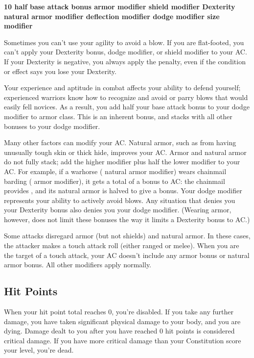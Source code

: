 {\centering \textbf{10 \add half base attack bonus \add armor modifier \add shield modifier \add Dexterity \add natural armor modifier \add deflection modifier \add dodge modifier \add size modifier}}

Sometimes you can't use your agility to avoid a blow. If you are flat-footed, you can't apply your Dexterity bonus, dodge modifier, or shield modifier to your AC. If your Dexterity is negative, you always apply the penalty, even if the condition or effect says you lose your Dexterity.

 Your experience and aptitude in combat affects your ability to defend yourself; experienced warriors know how to recognize and avoid or parry blows that would easily fell novices. As a result, you add half your base attack bonus to your dodge modifier to armor class. This is an inherent bonus, and stacks with all other bonuses to your dodge modifier.

 Many other factors can modify your AC.
 Natural armor, such as from having unusually tough skin or thick hide, improves your AC. Armor and natural armor do not fully stack; add the higher modifier plus half the lower modifier to your AC. For example, if a warhorse ( natural armor modifier) wears chainmail barding ( armor modifier), it gets a total of a  bonus to AC: the chainmail provides , and its natural armor is halved to give a  bonus.
 Your dodge modifier represents your ability to actively avoid blows. Any situation that denies you your Dexterity bonus also denies you your dodge modifier. (Wearing armor, however, does not limit these bonuses the way it limits a Dexterity bonus to AC.)

 Some attacks disregard armor (but not shields) and natural armor. In these cases, the attacker makes a touch attack roll (either ranged or melee). When you are the target of a touch attack, your AC doesn't include any armor bonus or natural armor bonus. All other modifiers apply normally.

\subsection{Hit Points}
When your hit point total reaches 0, you're disabled. If you take any further damage, you have taken significant physical damage to your body, and you are dying. Damage dealt to you after you have reached 0 hit points is considered critical damage. If you have more critical damage than your Constitution score \add your level, you're dead.


